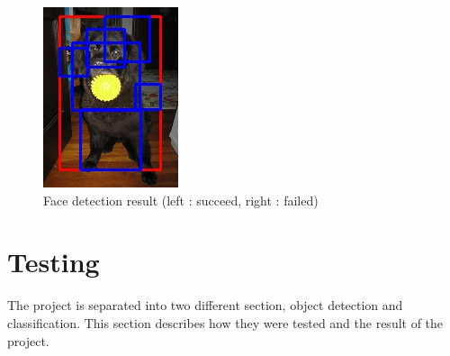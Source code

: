 \documentclass[conference,compsoc]{IEEEtran}
\begin{document}
\begin{figure}
\begin{multicols}{4}
    		\includegraphics[height=1.35\linewidth]{smolrect2.jpg}\par
	\end{multicols}
	\caption{Face detection result (left : succeed, right : failed)}
\end{figure}


\section{Testing}
The project is separated into two different section, object detection and classification.  This section describes how they were tested and the result of the project.
\end{document}
